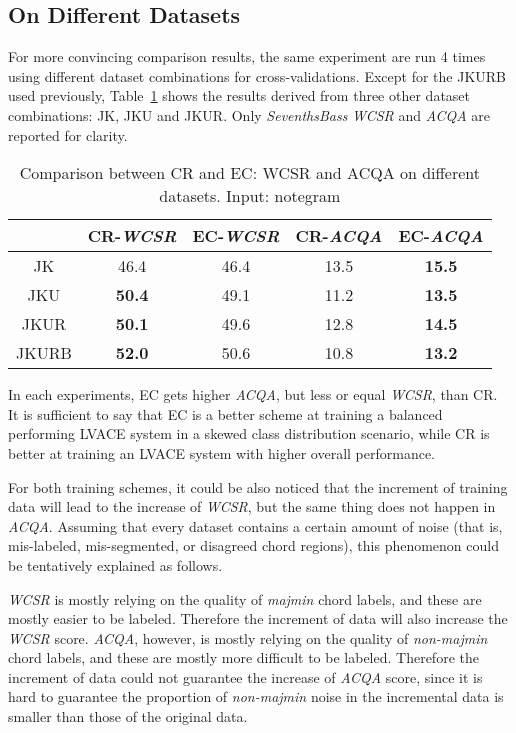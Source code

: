 \subsection{On Different Datasets}
For more convincing comparison results, the same experiment are run 4 times using different dataset combinations for cross-validations. Except for the JKURB used previously, Table~\ref{tab:datasize} shows the results derived from three other dataset combinations: JK, JKU and JKUR. Only \textit{SeventhsBass} \textit{WCSR} and \textit{ACQA} are reported for clarity.
\begin{table}[htb]
	\caption{Comparison between CR and EC: WCSR and ACQA on different datasets. Input: notegram}
	\centering
	\scriptsize
	\begin{tabular}{|c|c|c|c|c|} \hline
		& CR-\textit{WCSR} & EC-\textit{WCSR} & CR-\textit{ACQA} & EC-\textit{ACQA} \\ \hline
		JK & 46.4 & 46.4 & 13.5 & \textbf{15.5} \\ \hline
		JKU & \textbf{50.4} & 49.1 & 11.2 & \textbf{13.5} \\ \hline
		JKUR & \textbf{50.1} & 49.6 & 12.8 & \textbf{14.5} \\ \hline
		JKURB & \textbf{52.0} & 50.6 & 10.8 & \textbf{13.2} \\ \hline
	\end{tabular}
	\label{tab:datasize}
\end{table}
In each experiments, EC gets higher \textit{ACQA}, but less or equal \textit{WCSR}, than CR. It is sufficient to say that EC is a better scheme at training a balanced performing LVACE system in a skewed class distribution scenario, while CR is better at training an LVACE system with higher overall performance.

For both training schemes, it could be also noticed that the increment of training data will lead to the increase of \textit{WCSR}, but the same thing does not happen in \textit{ACQA}. Assuming that every dataset contains a certain amount of noise (that is, mis-labeled, mis-segmented, or disagreed chord regions), this phenomenon could be tentatively explained as follows.

\textit{WCSR} is mostly relying on the quality of \textit{majmin} chord labels, and these are mostly easier to be labeled. Therefore the increment of data will also increase the \textit{WCSR} score. \textit{ACQA}, however, is mostly relying on the quality of \textit{non-majmin} chord labels, and these are mostly more difficult to be labeled. Therefore the increment of data could not guarantee the increase of \textit{ACQA} score, since it is hard to guarantee the proportion of \textit{non-majmin} noise in the incremental data is smaller than those of the original data.

